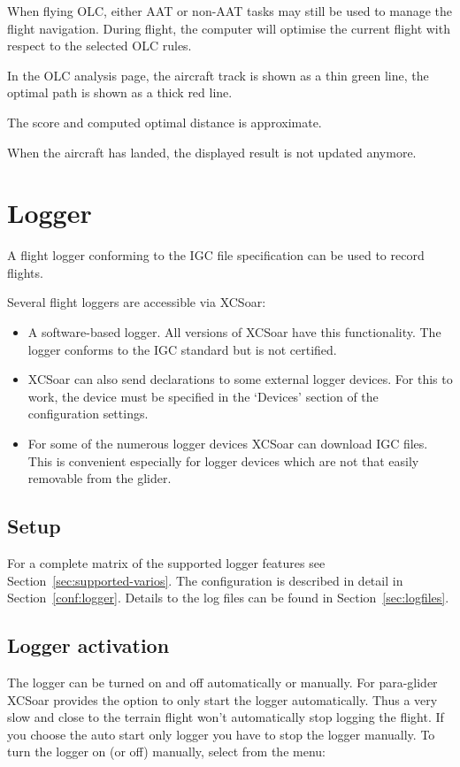 When flying OLC, either AAT or non-AAT tasks may still be used to
manage the flight navigation.  During flight, the computer will optimise the
current flight with respect to the selected OLC rules.  

In the OLC analysis page, the aircraft track is shown as a thin green line, the optimal 
path is shown as a thick red line.

The score and computed optimal distance is approximate.

When the aircraft has landed, the displayed result is not updated anymore.


\section{Logger}\label{sec:logger}

A flight logger conforming to the IGC file specification can be used
to record flights.  

Several flight loggers are accessible via XCSoar:
\begin{itemize}
\item A software-based logger.  All versions of XCSoar have this
  functionality.  The logger conforms to the IGC standard but is not
  certified.
\item XCSoar can also send declarations to some external logger devices. 
  For this to work, the device must be specified in the `Devices' 
  section of the configuration  settings.
\item  For some of the numerous logger devices XCSoar can download IGC files. 
  This is convenient especially for logger devices which are not that easily
  removable from the glider.
\end{itemize}

\subsection*{Setup}
For a complete matrix of the supported logger features see Section~\ref{sec:supported-varios}.
The configuration is described in detail in Section~\ref{conf:logger}.  Details
to the log files can be found in Section~\ref{sec:logfiles}.

\subsection*{Logger activation}
The logger can be turned on and off automatically or manually.  For para-glider 
XCSoar provides the option to only start the logger automatically. Thus a very 
slow and close to the terrain flight won't automatically stop logging the flight. 
If you choose the auto start only logger you have to stop the logger manually.
To turn the logger on (or off) manually, select from the menu:
\begin{quote}
\blink{}
\end{quote}

